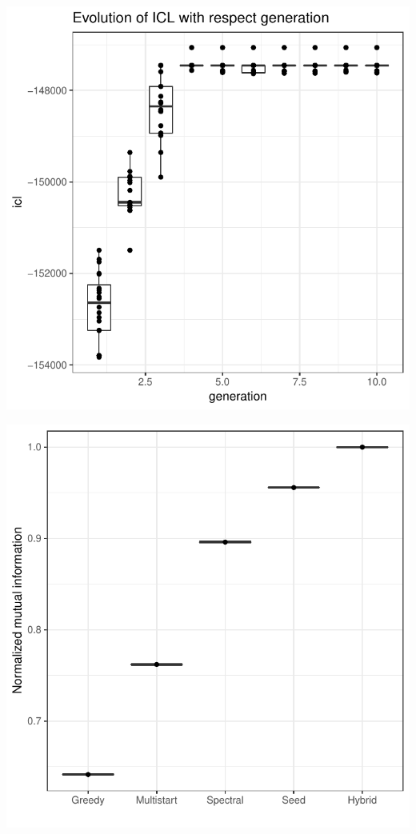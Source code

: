 \documentclass[]{article}
\begin{document}
\includegraphics{paper_files/figure-latex/unnamed-chunk-5-1.pdf}

\includegraphics{paper_files/figure-latex/unnamed-chunk-7-1.pdf}
\end{document}
